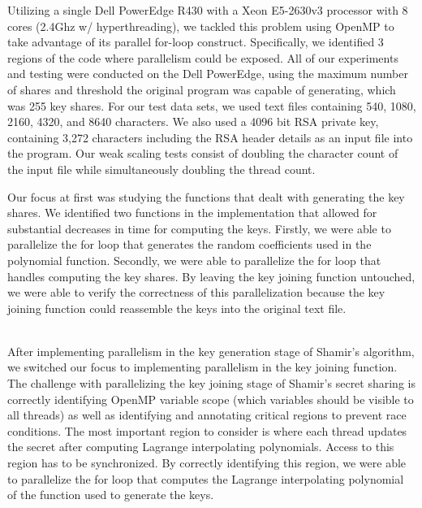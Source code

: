 \documentclass[main.tex]{subfiles}
\begin{document}
\indent Utilizing a single Dell PowerEdge R430 with a Xeon E5-2630v3 processor with 8 cores (2.4Ghz w/ hyperthreading), we tackled this problem using OpenMP to take advantage of its parallel for-loop construct. Specifically, we identified 3 regions of the code where parallelism could be exposed. All of our experiments and testing were conducted on the Dell PowerEdge, using the maximum number of shares and threshold the original program was capable of generating, which was 255 key shares.  For our test data sets, we used text files containing 540, 1080, 2160, 4320, and 8640 characters.  We also used a 4096 bit RSA private key, containing 3,272 characters including the RSA header details as an input file into the program.  Our weak scaling tests consist of doubling the character count of the input file while simultaneously doubling the thread count.

\indent Our focus at first was studying the functions that dealt with generating the key shares. We identified two functions in the implementation that allowed for substantial decreases in time for computing the keys.  Firstly, we were able to parallelize the for loop that generates the random coefficients used in the polynomial function.  Secondly, we were able to parallelize the for loop that handles computing the key shares.  By leaving the key joining function untouched, we were able to verify the correctness of this parallelization because the key joining function could reassemble the keys into the original text file.

\\
\indent After implementing parallelism in the key generation stage of Shamir's algorithm, we switched our focus to implementing parallelism in the key joining function.  The challenge with parallelizing the key joining stage of Shamir's secret sharing is correctly identifying OpenMP variable scope (which variables should be visible to all threads) as well as identifying and annotating critical regions to prevent race conditions. The most important region to consider is where each thread updates the secret after computing Lagrange interpolating polynomials.  Access to this region has to be synchronized. By correctly identifying this region, we were able to parallelize the for loop that computes the Lagrange interpolating polynomial of the function used to generate the keys.  
\end{document}
